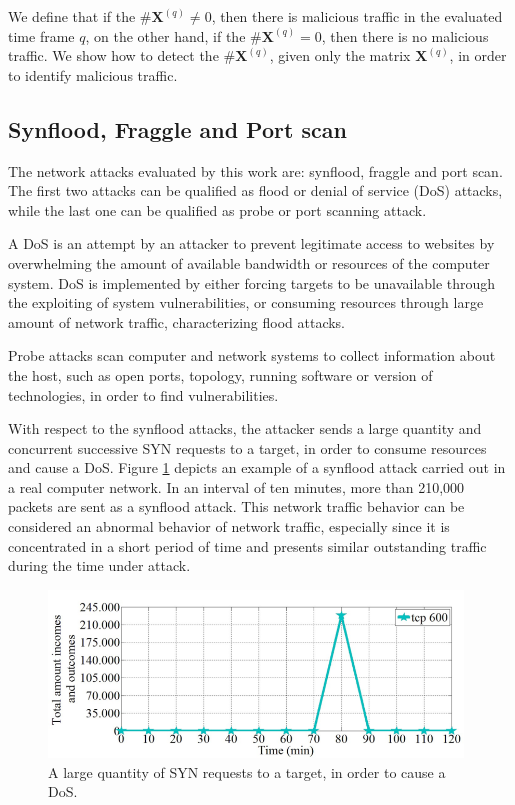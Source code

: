 We define that if the $\#\pmb{X}^{(q)} ≠ 0$, then there is malicious traffic in the evaluated time frame $q$, on the other hand, if the $\#\pmb{X}^{(q)} = 0$, then there is no malicious traffic. We show how to detect the $\#\pmb{X}^{(q)}$, given only the matrix $\pmb{X}^{(q)}$, in order to identify malicious traffic.

\subsection{Synflood, Fraggle and Port scan}
\label{sec:2_SynfloodFraggleandPortscan}

The network attacks evaluated by this work are: synflood, fraggle and port scan. The first two attacks can be qualified as flood or denial of service (DoS) attacks, while the last one can be qualified as probe or port scanning attack. 

A DoS is an attempt by an attacker to prevent legitimate access to websites by overwhelming the amount of available bandwidth or resources of the computer system. DoS is implemented by either forcing targets to be unavailable through the exploiting of system vulnerabilities, or consuming resources through large amount of network traffic, characterizing flood attacks.

Probe attacks scan computer and network systems to collect information about the host, such as open ports, topology, running software or version of technologies, in order to find vulnerabilities.

With respect to the synflood attacks, the attacker sends a large quantity and concurrent successive SYN requests to a target, in order to consume resources and cause a DoS. Figure \ref{fig:2.05} depicts an example of a synflood attack carried out in a real computer network. In an interval of ten minutes, more than 210,000 packets are sent as a synflood attack. This network traffic behavior can be considered an abnormal behavior of network traffic, especially since it is concentrated in a short period of time and presents similar outstanding traffic during the time under attack.

\begin{figure}[h!]
     \centering 
     \includegraphics[width=11cm]{figures/ch2/fig05.png}
     \caption{A large quantity of SYN requests to a target, in order to cause a DoS.}
     \label{fig:2.05}
\end{figure}

